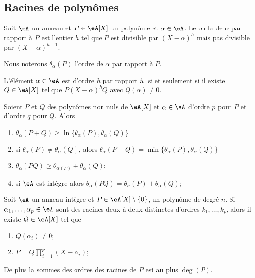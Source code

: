 
\subsection{Racines de polynômes}

Soit \( \eA\) un anneau et \( P\in \eA[X]\) un polynôme et \( \alpha\in \eA\). Le  ou la  de \( \alpha\) par rapport à \( P\) est l'entier \( h\) tel que \( P\) est divisible par \( (X-\alpha)^h\) mais pas divisible par \( (X-\alpha)^{h+1}\).

Nous noterons \( \theta_{\alpha}(P)\) l'ordre de \( \alpha\) par rapport à \( P\).

\begin{proposition}     \label{PropahQQpA}
    L'élément \( \alpha\in \eA\) est d'ordre \( h\) par rapport à \( \) si et seulement si il existe \( Q\in\eA[X]\) tel que \( P(X-\alpha)^hQ\) avec \( Q(\alpha)\neq 0\).
\end{proposition}

\begin{lemma}       \label{LemIeLhpc}
    Soient \( P\) et \( Q\) des polynômes non nuls de \( \eA[X]\) et \( \alpha\in \eA\) d'ordre \( p\) pour \( P\) et d'ordre \( q\) pour \( Q\). Alors
    \begin{enumerate}
        \item
            \( \theta_{\alpha}(P+Q)\geq\ln\{ \theta_{\alpha}(P),\theta_{\alpha}(Q) \}\)
        \item
            si \( \theta_{\alpha}(P)\neq \theta_{\alpha}(Q)\), alors \( \theta_{\alpha}(P+Q)=\min\{ \theta_{\alpha}(P),\theta_{\alpha}(Q) \}\)
        \item
            \( \theta_{\alpha}(PQ)\geq \theta_{\alpha(P)}+\theta_{\alpha}(Q)\);
        \item       \label{ItemIeLhpciv}
            si \(\eA \) est intègre alors \( \theta_{\alpha}(PQ)= \theta_{\alpha}(P)+\theta_{\alpha}(Q)\);
    \end{enumerate}
\end{lemma}

\begin{theorem}
    Soit \( \eA\) un anneau intègre et \( P\in \eA[X]\setminus\{ 0 \}\), un polynôme de degré \( n\). Si \( \alpha_1,\ldots, \alpha_p\in\eA\) sont des racines deux à deux distinctes d'ordres \( k_1,\ldots, k_p\), alors il existe \( Q\in \eA[X]\) tel que
    \begin{enumerate}
        \item
            \( Q(\alpha_i)\neq 0\);
        \item
            \( P=Q\prod_{i=1}^p(X-\alpha_i)\);
    \end{enumerate}
    De plus la sommes des ordres des racines de \( P\) est au plus \( \deg(P)\).
\end{theorem}

